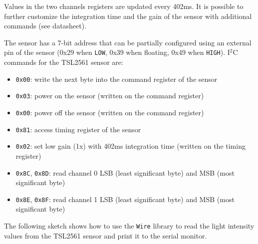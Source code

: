 Values in the two channels registers are updated every 402ms. It is possible to further customize the integration time and the
gain of the sensor with additional commands (see datasheet).

The sensor has a 7-bit address that can be partially configured using an external pin of the sensor (0x29 when \texttt{LOW},
0x39 when floating, 0x49 when \texttt{HIGH}). I\(^2\)C commands for the TSL2561 sensor are:
\begin{itemize}[itemsep=-1pt]
	\item \texttt{0x00}: write the next byte into the command register of the sensor
	\item \texttt{0x03}: power on the sensor (written on the command register)
	\item \texttt{0x00}: power off the sensor (written on the command register)
	\item \texttt{0x81}: access timing register of the sensor
	\item \texttt{0x02}: set low gain (1x) with 402ms integration time (written on the timing register)
	\item \texttt{0x8C}, \texttt{0x8D}: read channel 0 LSB (least significant byte) and MSB (most significant byte)
	\item \texttt{0x8E}, \texttt{0x8F}: read channel 1 LSB (least significant byte) and MSB (most significant byte)
\end{itemize}

The following sketch shows how to use the \texttt{Wire} library to read the light intensity values from the TSL2561 sensor and print
it to the serial monitor.

